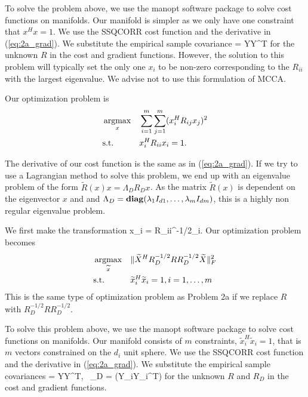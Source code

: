 To solve the problem above, we use the manopt software package to solve cost functions on
manifolds. Our manifold is simpler as we only have one constraint that $x^Hx=1$. We use
the SSQCORR cost function and the derivative in (\ref{eq:2a_grad}). We substitute the empirical
sample covariance 
\be
{} = YY^T
\ee
for the unknown $R$ in the cost and gradient functions. However, the solution to this
problem will typically set the only one $x_i$ to be non-zero corresponding to the $R_{ii}$
with the largest eigenvalue. We advise not to use this formulation of MCCA.



Our optimization problem is
\begin{equation*}
\begin{aligned}
&\mathop{\rm argmax}_{x}&&\sum_{i=1}^m\sum_{j=1}^m(x_i^HR_{ij}x_j)^2\\
&\text{s.t.} &&x_i^HR_{ii}x_i=1.\\
\end{aligned}
\end{equation*}

The derivative of our cost function is the same as in (\ref{eq:2a_grad}). If we try to use
a Lagrangian method to solve this problem, we end up with an eigenvalue problem of the
form $\widetilde{R}(x)x = \Lambda_D R_D x$. As the matrix $\widetilde{R}(x)$ is dependent
on the eigenvector $x$ and and $\Lambda_D= \mathop{\bf diag}(\lambda_1 I_{d1},\dots,\lambda_m
I_{dm})$, this is a highly non regular eigenvalue problem. 



We first make the transformation 
\be
x_i = R_{ii}^{-1/2}_i. 
\ee
Our optimization problem becomes
\begin{equation*}
\begin{aligned}
&\mathop{\rm argmax}_{\widetilde{x}}&&\|\widetilde{X}^HR_D^{-1/2}RR_D^{-1/2}\widetilde{X}\|_F^2\\
&\text{s.t.} &&\widetilde{x}_i^H\widetilde{x}_i = 1, i=1,\dots,m\\
\end{aligned}
\end{equation*}
This is the same type of optimization problem as Problem 2a if we replace $R$ with
$R_D^{-1/2}RR_D^{-1/2}$.

To solve this problem above, we use the manopt software package to solve cost functions on
manifolds. Our manifold consists of $m$ constraints, $\widetilde{x}^H_i\widetilde{x}_i=1$,
that is $m$ vectors constrained on the $d_i$ unit sphere. We use the SSQCORR cost function
and the derivative in (\ref{eq:2a_grad}). We substitute the empirical sample covariances 
\be
{} = YY^T,\,\,\, _D = \blkdiag(Y_iY_i^T)
\ee
 for the unknown $R$ and $R_D$ in the cost and gradient functions.

